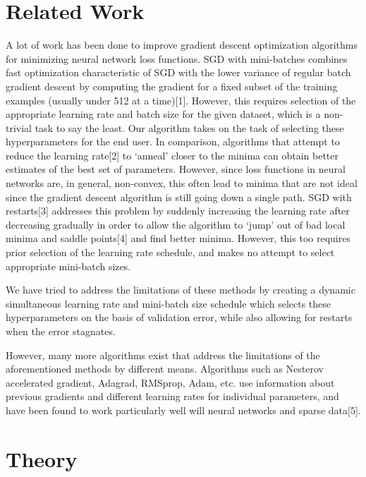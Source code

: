 \documentclass{article}
\begin{document}
\section{Related Work}
\par A lot of work has been done to improve gradient descent optimization algorithms for minimizing neural network loss functions. SGD with mini-batches combines fast optimization characteristic of SGD with the lower variance of regular batch gradient descent by computing the gradient for a fixed subset of the training examples (usually under 512 at a time)[1]. However, this requires selection of the appropriate learning rate and batch size for the given dataset, which is a non-trivial task to say the least. Our algorithm takes on the task of selecting these hyperparameters for the end user.  In comparison, algorithms that attempt to reduce the learning rate[2] to `anneal' closer to the minima can obtain better estimates of the best set of parameters. However, since loss functions in neural networks are, in general, non-convex, this often lead to minima that are not ideal since the gradient descent algorithm is still going down a single path. SGD with restarts[3] addresses this problem by suddenly increasing the learning rate after decreasing gradually in order to allow the algorithm to `jump' out of bad local minima and saddle points[4] and find better minima. However, this too requires prior selection of the learning rate schedule, and makes no attempt to select appropriate mini-batch sizes. 
\par We have tried to address the limitations of these methods by creating a dynamic simultaneous learning rate and mini-batch size schedule which selects these hyperparameters on the basis of validation error, while also allowing for restarts when the error stagnates. 
\par However, many more algorithms exist that address the limitations of the aforementioned methods by different means. Algorithms such as Nesterov accelerated gradient, Adagrad, RMSprop, Adam, etc. use information about previous gradients and different learning rates for individual parameters, and have been found to work particularly well will neural networks and sparse data[5]. 


\section{Theory} 
\end{document}
